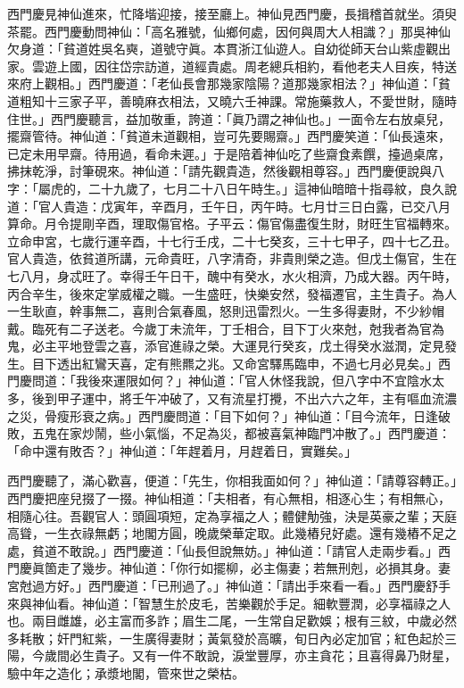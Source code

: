 西門慶見神仙進來，忙降堦迎接，接至廳上。神仙見西門慶，長揖稽首就坐。須臾茶罷。西門慶動問神仙：「高名雅號，仙鄉何處，因何與周大人相識？」那吳神仙欠身道：「貧道姓吳名奭，道號守眞。本貫浙江仙遊人。自幼從師天台山紫虛觀出家。雲遊上國，因往岱宗訪道，道經貴處。周老總兵相約，看他老夫人目疾，特送來府上觀相。」西門慶道：「老仙長會那幾家陰陽？道那幾家相法？」神仙道：「貧道粗知十三家子平，善曉麻衣相法，又曉六壬神課。常施藥救人，不愛世財，隨時住世。」西門慶聽言，益加敬重，誇道：「眞乃謂之神仙也。」一面令左右放桌兒，擺齋管待。神仙道：「貧道未道觀相，豈可先要賜齋。」西門慶笑道：「仙長遠來，已定未用早齋。待用過，看命未遲。」于是陪着神仙吃了些齋食素饌，擡過桌席，拂抹乾淨，討筆硯來。神仙道：「請先觀貴造，然後觀相尊容。」{}西門慶便說與八字：「屬虎的，二十九歲了，七月二十八日午時生。」這神仙暗暗十指尋紋，良久說道：「官人貴造：戊寅年，辛酉月，壬午日，丙午時。七月廿三日白露，已交八月算命。月令提剛辛酉，理取傷官格。子平云：傷官傷盡復生財，財旺生官福轉來。立命申宮，七歲行運辛酉，十七行壬戌，二十七癸亥，三十七甲子，四十七乙丑。官人貴造，依貧道所講，元命貴旺，八字清奇，非貴則榮之造。但戊土傷官，生在七八月，身忒旺了。幸得壬午日干，醜中有癸水，水火相濟，乃成大器。丙午時，丙合辛生，後來定掌威權之職。一生盛旺，快樂安然，發福遷官，主生貴子。為人一生耿直，幹事無二，喜則合氣春風，怒則迅雷烈火。一生多得妻財，不少紗帽戴。{}臨死有二子送老。今歲丁未流年，丁壬相合，目下丁火來尅，尅我者為官為鬼，必主平地登雲之喜，添官進祿之榮。大運見行癸亥，戊土得癸水滋潤，定見發生。目下透出紅鸞天喜，定有熊羆之兆。又命宮驛馬臨申，不過七月必見矣。」西門慶問道：「我後來運限如何？」神仙道：「官人休怪我說，但八字中不宜陰水太多，後到甲子運中，將壬午冲破了，又有流星打攪，不出六六之年，主有嘔血流濃之災，骨瘦形衰之病。」西門慶問道：「目下如何？」神仙道：「目今流年，日逢破敗，五鬼在家炒鬧，些小氣惱，不足為災，都被喜氣神臨門冲散了。」西門慶道：「命中還有敗否？」神仙道：「年趕着月，月趕着日，實難矣。」

西門慶聽了，滿心歡喜，便道：「先生，你相我面如何？」神仙道：「請尊容轉正。」西門慶把座兒掇了一掇。神仙相道：「夫相者，有心無相，相逐心生；有相無心，相隨心往。吾觀官人：頭圓項短，定為享福之人；體健觔強，決是英豪之輩；天庭高聳，一生衣祿無虧；地閣方圓，晚歲榮華定取。此幾樁兒好處。還有幾樁不足之處，貧道不敢說。」西門慶道：「仙長但說無妨。」神仙道：「請官人走兩步看。」西門慶眞箇走了幾步。神仙道：「你行如擺柳，必主傷妻；若無刑剋，必損其身。妻宮尅過方好。」西門慶道：「已刑過了。」神仙道：「請出手來看一看。」西門慶舒手來與神仙看。神仙道：「智慧生於皮毛，苦樂觀於手足。細軟豐潤，必享福祿之人也。兩目雌雄，必主富而多詐；眉生二尾，一生常自足歡娛；根有三紋，中歲必然多耗散；奸門紅紫，一生廣得妻財；黃氣發於高曠，旬日內必定加官；紅色起於三陽，今歲間必生貴子。又有一件不敢說，淚堂豐厚，亦主貪花；且喜得鼻乃財星，驗中年之造化；承漿地閣，管來世之榮枯。

